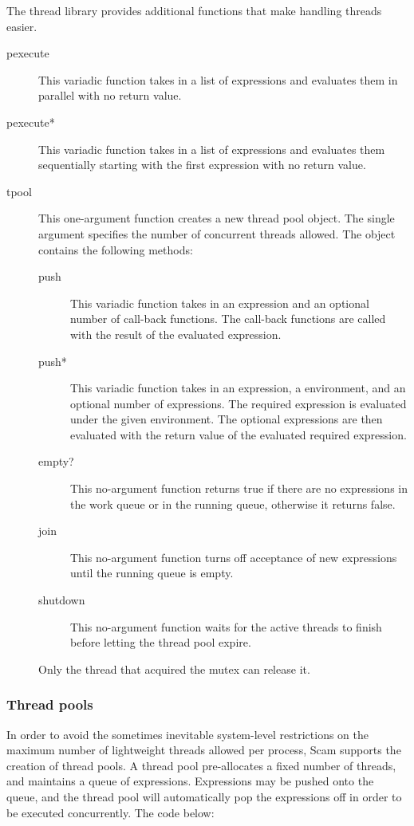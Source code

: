 The thread library provides additional functions that make handling threads easier.  

\begin{description}
\item[pexecute] This variadic function takes in a list of expressions and evaluates them in parallel with no return value.
\item[pexecute*] This variadic function takes in a list of expressions and evaluates them sequentially starting with the first expression with no return value.
\item[tpool] This one-argument function creates a new thread pool object.  The single argument specifies the number of concurrent threads allowed.
    The object contains the following methods:
    \begin{description}
        \item[push] This variadic function takes in an expression and an optional number of call-back functions.  The call-back functions are called with the result of the evaluated expression.
        \item[push*] This variadic function takes in an expression, a environment,  and an optional number of expressions.  The required expression is evaluated under the given environment.  The optional expressions are then evaluated with the return value of the evaluated required expression.
        \item[empty?] This no-argument function returns true if there are no expressions in the work queue or in the running queue, otherwise it returns false.
        \item[join] This no-argument function turns off acceptance of new expressions until the running queue is empty.
        \item[shutdown] This no-argument function waits for the active threads to finish before letting the thread pool expire. 
    \end{description}
Only the thread that acquired the mutex can release it.
\end{description}

\subsubsection{Thread pools}
In order to avoid the sometimes inevitable system-level restrictions on the maximum number of lightweight threads allowed per process, Scam supports the creation of thread pools.  A thread pool pre-allocates a fixed number of threads, and maintains a queue of expressions.  Expressions may be pushed onto the queue, and the thread pool will automatically pop the expressions off in order to be executed concurrently.  The code below:

